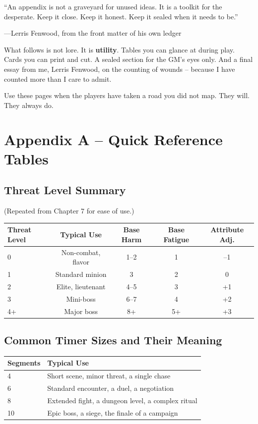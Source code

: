
\epigraph{``An appendix is not a graveyard for unused ideas. It is a toolkit for the desperate. Keep it close. Keep it honest. Keep it sealed when it needs to be.''}{---Lerris Fenwood, from the front matter of his own ledger}

What follows is not lore. It is \textbf{utility}. Tables you can glance at during play. Cards you can print and cut. A sealed section for the GM's eyes only. And a final essay from me, Lerris Fenwood, on the counting of wounds -- because I have counted more than I care to admit.

Use these pages when the players have taken a road you did not map. They will. They always do.

\section*{Appendix A -- Quick Reference Tables}

\subsection*{Threat Level Summary}

\noindent (Repeated from Chapter 7 for ease of use.)

\begin{tabular}{|l|c|c|c|c|}
\hline
\textbf{Threat Level} & \textbf{Typical Use} & \textbf{Base Harm} & \textbf{Base Fatigue} & \textbf{Attribute Adj.} \\
\hline
0 & Non-combat, flavor & 1--2 & 1 & --1 \\
1 & Standard minion & 3 & 2 & 0 \\
2 & Elite, lieutenant & 4--5 & 3 & +1 \\
3 & Mini-boss & 6--7 & 4 & +2 \\
4+ & Major boss & 8+ & 5+ & +3 \\
\hline
\end{tabular}

\subsection*{Common Timer Sizes and Their Meaning}

\begin{tabular}{|l|l|}
\hline
\textbf{Segments} & \textbf{Typical Use} \\
\hline
4 & Short scene, minor threat, a single chase \\
6 & Standard encounter, a duel, a negotiation \\
8 & Extended fight, a dungeon level, a complex ritual \\
10 & Epic boss, a siege, the finale of a campaign \\
\hline
\end{tabular}

